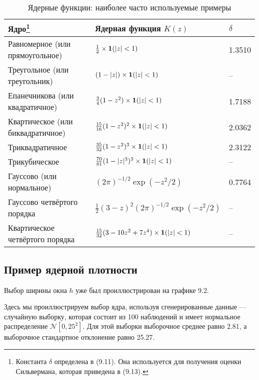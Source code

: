 \begin{table}[h]
\begin{center}
\caption{\label{tab:pred} Ядерные функции: наиболее часто используемые примеры}
\begin{minipage}{16.5cm}
\begin{tabular}[t]{lll}
\hline
\hline
\bf{Ядро}\footnote{Константа $\delta$ определена в (9.11). Она используется для получения оценки Сильвермана, которая приведена в (9.13).} & \bf{Ядерная функция $K(z)$} & \bf{$\delta$} \\
\hline
Равномерное (или прямоугольное) & $\frac{1}{2} \times {\bf{1}} (|z| < 1)$ & 1.3510 \\
Треугольное (или треугольник) & $(1 - |z|) \times {\bf{1}} (|z| < 1)$ & -- \\
Епанечникова (или квадратичное) & $\frac{3}{4} (1 - z^2) \times {\bf{1}} (|z| < 1)$ & 1.7188 \\
Квартическое (или биквадратичное) & $\frac{15}{16} (1 - z^2)^2 \times {\bf{1}} (|z| < 1)$ & 2.0362 \\
Триквадратичное & $\frac{35}{32} (1 - z^2)^3 \times {\bf{1}} (|z| < 1)$ & 2.3122 \\
Трикубическое & $\frac{70}{81} (1 - |z|^3)^3 \times {\bf{1}} (|z| < 1)$ & -- \\
Гауссово (или нормальное) & $(2\pi)^{-1/2}\exp(-z^2/2)$ & 0.7764 \\
Гауссово четвёртого порядка & $\frac{1}{2}(3-z)^2(2\pi)^{-1/2}\exp(-z^2/2)$ & -- \\
Квартическое четвёртого порядка & $\frac{15}{32}(3-10z^2+7z^4)\times {\bf{1}} (|z| < 1)$ & -- \\
\hline
\hline
\end{tabular}
\end{minipage}
\end{center}
\end{table}

\subsection{Пример ядерной плотности}

Выбор ширины окна $h$ уже был проиллюстрирован на графике 9.2.

Здесь мы проиллюстрируем выбор ядра, используя сгенерированные данные --- случайную выборку, которая состоит из 100 наблюдений и имеет нормальное распределение $\mathcal{N}[0,25^2]$. Для этой выборки выборочное среднее равно 2.81, а выборочное стандартное отклонение равно 25.27.

